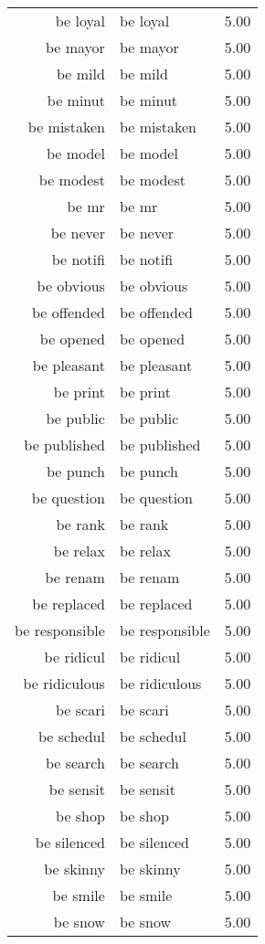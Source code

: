 \begin{table}[ht]
\begin{tabular}{rlr}
  be loyal & be loyal & 5.00 \\ 
  be mayor & be mayor & 5.00 \\ 
  be mild & be mild & 5.00 \\ 
  be minut & be minut & 5.00 \\ 
  be mistaken & be mistaken & 5.00 \\ 
  be model & be model & 5.00 \\ 
  be modest & be modest & 5.00 \\ 
  be mr & be mr & 5.00 \\ 
  be never & be never & 5.00 \\ 
  be notifi & be notifi & 5.00 \\ 
  be obvious & be obvious & 5.00 \\ 
  be offended & be offended & 5.00 \\ 
  be opened & be opened & 5.00 \\ 
  be pleasant & be pleasant & 5.00 \\ 
  be print & be print & 5.00 \\ 
  be public & be public & 5.00 \\ 
  be published & be published & 5.00 \\ 
  be punch & be punch & 5.00 \\ 
  be question & be question & 5.00 \\ 
  be rank & be rank & 5.00 \\ 
  be relax & be relax & 5.00 \\ 
  be renam & be renam & 5.00 \\ 
  be replaced & be replaced & 5.00 \\ 
  be responsible & be responsible & 5.00 \\ 
  be ridicul & be ridicul & 5.00 \\ 
  be ridiculous & be ridiculous & 5.00 \\ 
  be scari & be scari & 5.00 \\ 
  be schedul & be schedul & 5.00 \\ 
  be search & be search & 5.00 \\ 
  be sensit & be sensit & 5.00 \\ 
  be shop & be shop & 5.00 \\ 
  be silenced & be silenced & 5.00 \\ 
  be skinny & be skinny & 5.00 \\ 
  be smile & be smile & 5.00 \\ 
  be snow & be snow & 5.00 \\ 

\end{tabular}
\end{table}
